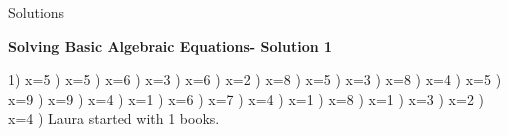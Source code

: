 \documentclass{article}%
\begin{document}
%
\newline%
\newline%
\newline%
\pagebreak%
\huge%
\vspace*{\fill}%
\begin{center}%
Solutions%
\end{center}%
\vspace*{\fill}%
\normalsize%
\pagebreak%
\large%
\begin{center}%
\textbf{Solving Basic Algebraic Equations- Solution 1}%
\newline%
\end{center} \normalsize%
1) x=5%
) x=5%
) x=6%
) x=3%
) x=6%
) x=2%
) x=8%
) x=5%
) x=3%
) x=8%
) x=4%
) x=5%
) x=9%
) x=9%
) x=4%
) x=1%
) x=6%
) x=7%
) x=4%
) x=1%
) x=8%
) x=1%
) x=3%
) x=2%
) x=4%
) Laura started with 1 books.%
\newline%
\end{document}
